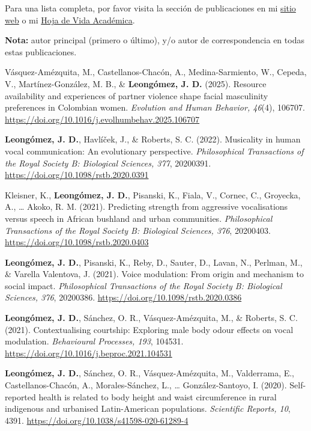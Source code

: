 \documentclass[11pt,a4paper,]{awesome-cv}
\begin{document}
Para una lista completa, por favor visita la sección de publicaciones en
mi \href{https://jdleongomez.info/es/publication/}{sitio web} o mi
\href{https://jdleongomez.github.io/JDL_CV/CV_esp/JDL_CV_es.pdf}{Hoja de
Vida Académica}.

\begingroup
  \footnotesize

\begin{importantnote}
    \textbf{Nota:} autor principal (primero o último), y/o autor de correspondencia en todas estas publicaciones.
  \end{importantnote}

\setlength{\parindent}{-0.5in} \setlength{\leftskip}{0.5in}

Vásquez-Amézquita, M., Castellanos-Chacón, A., Medina-Sarmiento, W.,
Cepeda, V., Martínez-González, M. B., \& \textbf{Leongómez, J. D.}
(2025). Resource availability and experiences of partner violence shape
facial masculinity preferences in Colombian women. \emph{Evolution and
Human Behavior, 46}(4), 106707.
\url{https://doi.org/10.1016/j.evolhumbehav.2025.106707}

\textbf{Leongómez, J. D.}, Havlíček, J., \& Roberts, S. C. (2022).
Musicality in human vocal communication: An evolutionary perspective.
\emph{Philosophical Transactions of the Royal Society B: Biological
Sciences, 377}, 20200391. \url{https://doi.org/10.1098/rstb.2020.0391}

Kleisner, K., \textbf{Leongómez, J. D.}, Pisanski, K., Fiala, V.,
Cornec, C., Groyecka, A., \ldots{} Akoko, R. M. (2021). Predicting
strength from aggressive vocalisations versus speech in African bushland
and urban communities. \emph{Philosophical Transactions of the Royal
Society B: Biological Sciences, 376}, 20200403.
\url{https://doi.org/10.1098/rstb.2020.0403}

\textbf{Leongómez, J. D.}, Pisanski, K., Reby, D., Sauter, D., Lavan,
N., Perlman, M., \& Varella Valentova, J. (2021). Voice modulation: From
origin and mechanism to social impact. \emph{Philosophical Transactions
of the Royal Society B: Biological Sciences, 376}, 20200386.
\url{https://doi.org/10.1098/rstb.2020.0386}

\textbf{Leongómez, J. D.}, Sánchez, O. R., Vásquez-Amézquita, M., \&
Roberts, S. C. (2021). Contextualising courtship: Exploring male body
odour effects on vocal modulation. \emph{Behavioural Processes, 193},
104531. \url{https://doi.org/10.1016/j.beproc.2021.104531}

\textbf{Leongómez, J. D.}, Sánchez, O. R., Vásquez-Amézquita, M.,
Valderrama, E., Castellanos-Chacón, A., Morales-Sánchez, L., \ldots{}
González-Santoyo, I. (2020). Self-reported health is related to body
height and waist circumference in rural indigenous and urbanised
Latin-American populations. \emph{Scientific Reports, 10}, 4391.
\url{https://doi.org/10.1038/s41598-020-61289-4}
\end{document}
